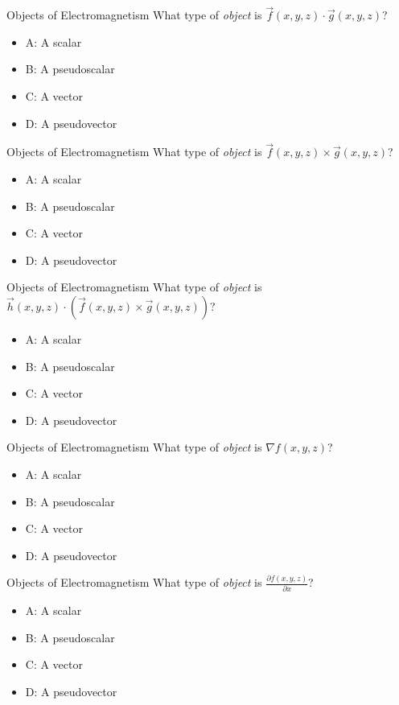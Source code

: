 \documentclass{beamer}
\begin{document}
\begin{frame}{Objects of Electromagnetism}
What type of \textit{object} is $\vec{f}(x,y,z) \cdot \vec{g}(x,y,z)$?
\begin{itemize}
\item A: A scalar
\item B: A pseudoscalar
\item C: A vector
\item D: A pseudovector
\end{itemize}
\end{frame}

\begin{frame}{Objects of Electromagnetism}
What type of \textit{object} is $\vec{f}(x,y,z) \times \vec{g}(x,y,z)$?
\begin{itemize}
\item A: A scalar
\item B: A pseudoscalar
\item C: A vector
\item D: A pseudovector
\end{itemize}
\end{frame}

\begin{frame}{Objects of Electromagnetism}
What type of \textit{object} is $\vec{h}(x,y,z) \cdot (\vec{f}(x,y,z) \times \vec{g}(x,y,z))$?
\begin{itemize}
\item A: A scalar
\item B: A pseudoscalar
\item C: A vector
\item D: A pseudovector
\end{itemize}
\end{frame}

\begin{frame}{Objects of Electromagnetism}
What type of \textit{object} is $\nabla f(x,y,z)$?
\begin{itemize}
\item A: A scalar
\item B: A pseudoscalar
\item C: A vector
\item D: A pseudovector
\end{itemize}
\end{frame}

\begin{frame}{Objects of Electromagnetism}
What type of \textit{object} is $\frac{\partial f(x,y,z)}{\partial x}$?
\begin{itemize}
\item A: A scalar
\item B: A pseudoscalar
\item C: A vector
\item D: A pseudovector
\end{itemize}
\end{frame}
\end{document}
